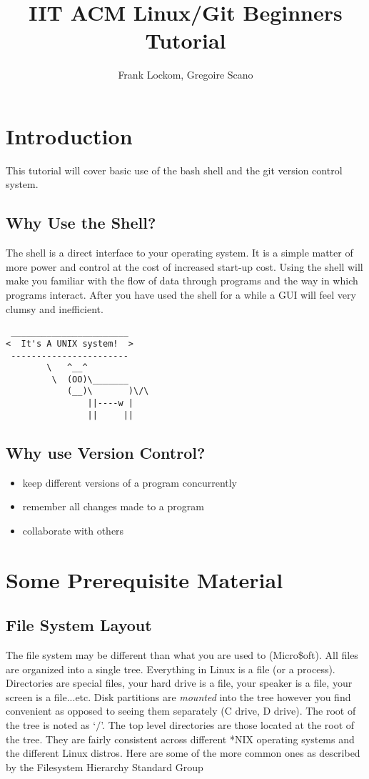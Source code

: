 \documentclass[10pt]{article}
\title{IIT ACM Linux/Git Beginners Tutorial}
\author{Frank Lockom, Gregoire Scano}
\begin{document}
\maketitle

\section{Introduction}
This tutorial will cover basic use of the bash shell and the git version control system.

  \subsection{Why Use the Shell?}  
  The shell is a direct interface to your operating system. It is a simple matter of more power and control at the cost of increased start-up cost. Using the shell will make you familiar with the flow of data through programs and the way in which programs interact. After you have used the shell for a while a GUI will feel very clumsy and inefficient.
  \begin{verbatim}
 _______________________ 
<  It's A UNIX system!  >
 ----------------------- 
        \   ^__^
         \  (OO)\_______
            (__)\       )\/\
                ||----w |
                ||     ||
  \end{verbatim}


  \subsection{Why use Version Control?}
  \begin{itemize}
    \item
      keep different versions of a program concurrently
    \item
      remember all changes made to a program
    \item
      collaborate with others 
  \end{itemize}

\section{Some Prerequisite Material}

  \subsection{File System Layout}  
  The file system may be different than what you are used to (Micro\$oft). All files are organized into a single tree. Everything in Linux is a file (or a process). Directories are special files, your hard drive is a file, your speaker is a file, your screen is a file...etc. Disk partitions are \textit{mounted} into the tree however you find convenient as opposed to seeing them separately (C drive, D drive). The root of the tree is noted as `$/$'. The top level directories are those located at the root of the tree. They are fairly consistent across different *NIX operating systems and the different Linux distros. Here are some of the more common ones as described by the Filesystem Hierarchy Standard Group~\cite{fhs}
\end{document}
